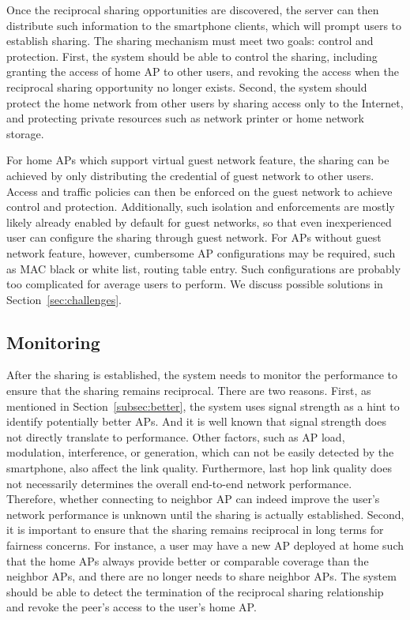 Once the reciprocal sharing opportunities are discovered, the \wisefi{} server
can then distribute such information to the smartphone clients, which will
prompt users to establish \wifi{} sharing. The sharing mechanism must meet two
goals: control and protection. First, the system should be able to control the
sharing, including granting the access of home AP to other \wisefi{} users, and
revoking the access when the reciprocal sharing opportunity no longer exists.
Second, the system should protect the home network from other \wisefi{} users by
sharing access only to the Internet, and protecting private resources such as
network printer or home network storage.

For home APs which support virtual guest network feature, the \wifi{} sharing
can be achieved by only distributing the credential of guest network to other
\wisefi{} users. Access and traffic policies can then be enforced on the guest
network to achieve control and protection. Additionally, such isolation and
enforcements are mostly likely already enabled by default for guest networks, so
that even inexperienced user can configure the \wifi{} sharing through guest
network. For APs without guest network feature, however, cumbersome AP
configurations may be required, such as MAC black or white list, routing table
entry. Such configurations are probably too complicated for average users to
perform. We discuss possible solutions in Section~\ref{sec:challenges}.


\subsection{Monitoring}
\label{subsec:monitoring}

After the sharing is established, the system needs to monitor the \wifi{}
performance to ensure that the sharing remains reciprocal. There are two
reasons. First, as mentioned in Section~\ref{subsec:better}, the system uses
signal strength as a hint to identify potentially better APs. And it is well
known that signal strength does not directly translate to \wifi{} performance.
Other factors, such as AP load, modulation, interference, or \wifi{} generation,
which can not be easily detected by the smartphone, also affect the link
quality. Furthermore, last hop \wifi{} link quality does not necessarily
determines the overall end-to-end network performance. Therefore, whether
connecting to neighbor AP can indeed improve the user's network performance is
unknown until the sharing is actually established. Second, it is important to
ensure that the sharing remains reciprocal in long terms for fairness concerns.
For instance, a \wisif{} user may have a new AP deployed at home such that the
home APs always provide better or comparable \wifi{} coverage than the neighbor
APs, and there are no longer needs to share neighbor APs. The system should be
able to detect the termination of the reciprocal sharing relationship and revoke
the peer's access to the user's home AP.

